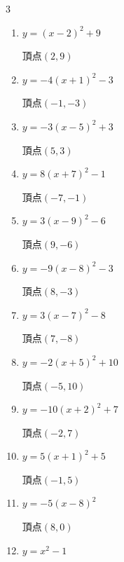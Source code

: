 \begin{multicols}{3}
\begin{enumerate}
  \item $\displaystyle y=\left( x-2\right)^{2}+9$

        $\displaystyle 頂点\left( 2 , 9 \right)$

\columnbreak %

  \item $\displaystyle y=-4\left( x+1\right)^{2}-3$

        $\displaystyle 頂点\left( -1 , -3 \right)$

  \item $\displaystyle y=-3\left( x-5\right)^{2}+3$

        $\displaystyle 頂点\left( 5 , 3 \right)$

  \item $\displaystyle y=8\left( x+7\right)^{2}-1$

        $\displaystyle 頂点\left( -7 , -1 \right)$

  \item $\displaystyle y=3\left( x-9\right)^{2}-6$

        $\displaystyle 頂点\left( 9 , -6 \right)$

  \item $\displaystyle y=-9\left( x-8\right)^{2}-3$

        $\displaystyle 頂点\left( 8 , -3 \right)$

  \item $\displaystyle y=3\left( x-7\right)^{2}-8$

        $\displaystyle 頂点\left( 7 , -8 \right)$

  \item $\displaystyle y=-2\left( x+5\right)^{2}+10$

        $\displaystyle 頂点\left( -5 , 10 \right)$

  \item $\displaystyle y=-10\left( x+2\right)^{2}+7$

        $\displaystyle 頂点\left( -2 , 7 \right)$

  \item $\displaystyle y=5\left( x+1\right)^{2}+5$

        $\displaystyle 頂点\left( -1 , 5 \right)$

  \item $\displaystyle y=-5\left( x-8\right)^{2}$

        $\displaystyle 頂点\left( 8 , 0 \right)$

  \item $\displaystyle y=x^{2}-1$


\end{enumerate}
\end{multicols}
